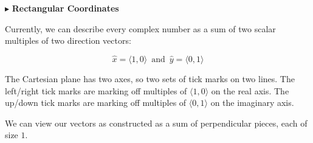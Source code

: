 \documentclass{ximera}
\begin{document}
$\blacktriangleright$ \textbf{\textcolor{blue!75!black}{Rectangular Coordinates}}  


Currently, we can describe every complex number as a sum of two scalar multiples of two direction vectors: 

\[ \hat{x} = \langle 1, 0 \rangle  \, \text{ and }  \, \hat{y} = \langle 0, 1 \rangle      \]


The Cartesian plane has two axes, so two sets of tick marks on two lines.  The left/right tick marks are marking off multiples of $\langle 1, 0 \rangle$ on the real axis. The up/down tick marks are marking off multiples of $\langle 0, 1 \rangle$ on the imaginary axis.




We can view our vectors as constructed as a sum of perpendicular pieces, each of size $1$.
\end{document}
